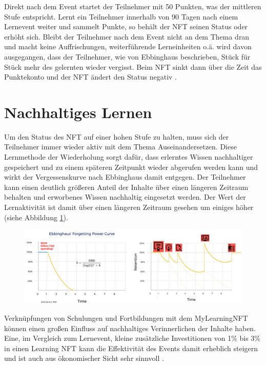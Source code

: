 Direkt nach dem Event startet der Teilnehmer mit 50 Punkten, was der mittleren Stufe entspricht.
Lernt ein Teilnehmer innerhalb von 90 Tagen nach einem Lernevent weiter und sammelt Punkte, so behält der \ac{NFT} seinen Status oder erhöht sich.
Bleibt der Teilnehmer nach dem Event nicht an dem Thema dran und macht keine Auffrischungen, weiterführende Lerneinheiten o.ä. wird davon ausgegangen,
dass der Teilnehmer, wie von Ebbinghaus beschrieben, Stück für Stück mehr des gelernten wieder vergisst.
Beim \ac{NFT} sinkt dann über die Zeit das Punktekonto und der \ac{NFT} ändert den Status negativ \parencite[vgl.][]{MyLearningNFT.2022}.

\section{Nachhaltiges Lernen}

Um den Status des \ac{NFT} auf einer hohen Stufe zu halten, muss sich der Teilnehmer immer wieder aktiv mit dem Thema Auseinandersetzen.
Diese Lernmethode der Wiederholung sorgt dafür, dass erlerntes Wissen nachhaltiger gespeichert und zu einem späteren Zeitpunkt wieder abgerufen werden kann \parencite[vgl.][221-223]{Sattler.2009}
und wirkt der Vergessenskurve nach Ebbinghaus damit entgegen.
Der Teilnehmer kann einen deutlich größeren Anteil der Inhalte über einen längeren Zeitraum behalten und erworbenes Wissen nachhaltig eingesetzt werden.
Der Wert der Lernaktivität ist damit über einen längeren Zeitraum gesehen um einiges höher (siehe Abbildung \ref{forg}).

\begin{figure}[h]
    \includegraphics[width=15.8cm]{Bilder/EbinghausForgeting.png}
    \centering
    \label{forg}
\end{figure}

Verknüpfungen von Schulungen und Fortbildungen mit dem MyLearning\ac{NFT} können einen großen Einfluss auf nachhaltiges Verinnerlichen der Inhalte haben.
Eine, im Vergleich zum Lernevent, kleine zusätzliche Investitionen von 1\% bis 3\% in einen Learning \ac{NFT} kann die Effektivität des Events damit erheblich steigern
und ist auch aus ökonomischer Sicht sehr sinnvoll \parencite[vgl.][]{MyLearningNFT.2022}.

